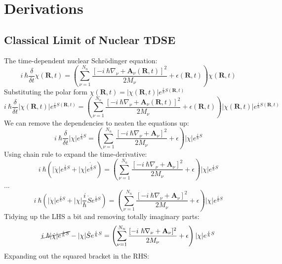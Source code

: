 
\appendix
\chapter{Derivations}
\label{ap:derivations}
\section{Classical Limit of Nuclear TDSE \label{ap:polar_X}}
The time-dependent nuclear Schr\"odinger equation:
\[i \ \hbar \frac{\delta}{\delta t} \chi (\textbf{R}, t) = \left( \sum_{\nu = 1}^{N_{n}} \frac{[-i \ \hbar\nabla_{\nu} + \textbf{A}_{\nu}(\textbf{R}, t)]^2}{2 M_{\nu}} + \epsilon(\textbf{R}, t)\right) \chi (\textbf{R}, t)\]
Substituting the polar form $\chi(\textbf{R}, t) = |\chi(\textbf{R}, t)|e^{\frac{i}{\hbar}S(\textbf{R}, t)}$
\[i \ \hbar \frac{\delta}{\delta t} |\chi(\textbf{R}, t)|e^{\frac{i}{\hbar}S(\textbf{R}, t)} = \left( \sum_{\nu = 1}^{N_{n}} \frac{[-i \ \hbar\nabla_{\nu} + \textbf{A}_{\nu}(\textbf{R}, t)]^2}{2 M_{\nu}} + \epsilon(\textbf{R}, t)\right) |\chi(\textbf{R}, t)|e^{\frac{i}{\hbar}S(\textbf{R}, t)}\]
We can remove the dependencies to neaten the equations up:
\[i \ \hbar \frac{\delta}{\delta t} |\chi|e^{\frac{i}{\hbar}S} = \left( \sum_{\nu = 1}^{N_{n}} \frac{[-i \ \hbar\nabla_{\nu} + \textbf{A}_{\nu}]^2}{2 M_{\nu}} + \epsilon \right) |\chi |e^{\frac{i}{\hbar}S}\]
Using chain rule to expand the time-derivative:
\[i \ \hbar (|\dot{\chi}|e^{\frac{i}{\hbar}S} + |\chi|\dot{e^{\frac{i}{\hbar}S}}) = \left( \sum_{\nu = 1}^{N_{n}} \frac{[-i \ \hbar\nabla_{\nu} + \textbf{A}_{\nu}]^2}{2 M_{\nu}} + \epsilon \right) |\chi |e^{\frac{i}{\hbar}S}\]
...
\[i \ \hbar (|\dot{\chi}|e^{\frac{i}{\hbar}S} + |\chi|\frac{i}{\hbar}\dot{S} e^{\frac{i}{\hbar}S}) = \left( \sum_{\nu = 1}^{N_{n}} \frac{[-i \ \hbar\nabla_{\nu} + \textbf{A}_{\nu}]^2}{2 M_{\nu}} + \epsilon \right) |\chi |e^{\frac{i}{\hbar}S}\]
Tidying up the LHS a bit and removing totally imaginary parts:
\[\cancel{i \ \hbar |\dot{\chi}|e^{\frac{i}{\hbar}S}} - |\chi|\dot{S} e^{\frac{i}{\hbar}S} = \left( \sum_{\nu = 1}^{N_{n}} \frac{[-i \ \hbar\nabla_{\nu} + \textbf{A}_{\nu}]^2}{2 M_{\nu}} + \epsilon \right) |\chi |e^{\frac{i}{\hbar}S}\]
Expanding out the squared bracket in the RHS:
